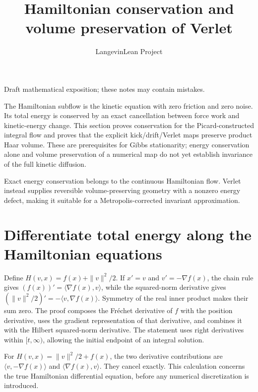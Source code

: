 \documentclass[11pt,a4paper]{article}
\title{\texorpdfstring{Hamiltonian conservation and volume preservation of Verlet}{Hamiltonian conservation and volume preservation of Verlet}}
\author{LangevinLean Project}
\date{}
\begin{document}
\maketitle
Draft mathematical exposition; these notes may contain mistakes.


The Hamiltonian subflow is the kinetic equation with zero friction and zero noise. Its total energy is conserved by an exact cancellation between force work and kinetic-energy change. This section proves conservation for the Picard-constructed integral flow and proves that the explicit kick/\allowbreak{}drift/\allowbreak{}Verlet maps preserve product Haar volume. These are prerequisites for Gibbs stationarity; energy conservation alone and volume preservation of a numerical map do not yet establish invariance of the full kinetic diffusion.



Exact energy conservation belongs to the continuous Hamiltonian flow. Verlet instead supplies reversible volume-preserving geometry with a nonzero energy defect, making it suitable for a Metropolis-corrected invariant approximation.


\section{\texorpdfstring{Differentiate total energy along the Hamiltonian equations}{Differentiate total energy along the Hamiltonian equations}}


Define \(H(v,x)=f(x)+\|v\|^2/2\). If \(x'=v\) and \(v'=-\nabla f(x)\), the chain rule gives \((f(x))'=\langle\nabla f(x),v\rangle\), while the squared-norm derivative gives \((\|v\|^2/2)'=-\langle v,\nabla f(x)\rangle\). Symmetry of the real inner product makes their sum zero. The proof composes the Fréchet derivative of \(f\) with the position derivative, uses the gradient representation of that derivative, and combines it with the Hilbert squared-norm derivative. The statement uses right derivatives within \([t,\infty)\), allowing the initial endpoint of an integral solution.



For \(H(v,x)=\|v\|^2/2+f(x)\), the two derivative contributions are \(\langle v,-\nabla f(x)\rangle\) and \(\langle\nabla f(x),v\rangle\). They cancel exactly. This calculation concerns the true Hamiltonian differential equation, before any numerical discretization is introduced.
\end{document}
